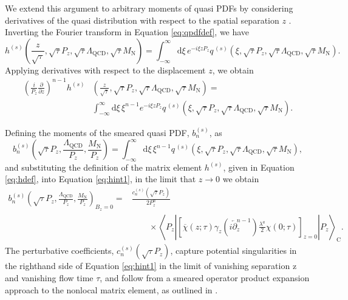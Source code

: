 We extend this argument to arbitrary 
moments of quasi PDFs by considering derivatives of the quasi distribution with 
respect to the spatial separation $z$ \cite{Collins:2011zzd}. Inverting the 
Fourier transform in Equation \eqref{eq:qpdfdef}, we have
\begin{equation}\label{eq:handqpdf}
h^{(s)}\left(\frac{z}{\sqrt{\tau}},\sqrt{\tau}P_z,\sqrt{\tau}\Lambda_{\mathrm{
QCD}},
\sqrt{\tau}
M_\mathrm{N}\right)
=
\int_{-\infty}^\infty \mathrm{d}\xi\, e^{-i\xi z 
P_z} 
q^{\,(s)}\left(\xi,\sqrt{\tau}P_z,\sqrt{\tau}\Lambda_{\mathrm{QCD}},\sqrt{\tau}
M_\mathrm{N}\right).
\end{equation}
Applying derivatives with respect to the displacement $z$, we obtain
\begin{align}\label{eq:hint1}
\left(\frac{i}{P_z}\frac{\partial}{\partial 
z}\right)^{n-1} 
h^{(s)}{} & 
\left(\frac{z}{\sqrt{\tau}},\sqrt{\tau}P_z,\sqrt{\tau}\Lambda_{\mathrm{QCD}},
\sqrt{
\tau }
M_\mathrm{N}\right) = \nonumber\\
{} & \int_{-\infty}^\infty \mathrm{d}\xi\, \xi^{n-1}e^{-i\xi z 
P_z} 
q^{\,(s)}\left(\xi,\sqrt{\tau}P_z,\sqrt{\tau}\Lambda_{\mathrm{QCD}},\sqrt{\tau}
M_\mathrm{N}\right).
\end{align}

Defining the moments of the smeared quasi PDF, $b_n^{(s)}$, as
\begin{equation}\label{eq:bdef}
b_n^{(s)}\left(\sqrt{\tau}P_z,\frac{\Lambda_{\mathrm{QCD}}}{P_z}, 
\frac{M_\mathrm{N}}{P_z}\right) 
= \int_{-\infty}^\infty 
\mathrm{d}\xi\, \xi^{n-1} 
q^{\,(s)}\left(\xi,\sqrt{\tau}P_z,\sqrt{\tau}\Lambda_{\mathrm{QCD}},\sqrt{\tau}
M_\mathrm{N}\right),
\end{equation}
and substituting the definition of the matrix element $h^{(s)}$, given in 
Equation \eqref{eq:hdef}, into Equation \eqref{eq:hint1}, in the limit that 
$z\rightarrow 0$ we obtain
\begin{align}
b_n^{(s)}\left( \sqrt{\tau}P_z,\frac{\Lambda_{\mathrm{QCD}}}{P_z}, 
\frac{M_\mathrm{N}}{P_z}\right)_{B_z=0}
= {} & \frac{c_n^{(s)}(\sqrt{\tau}P_z)}{2P_z^n} \nonumber\\
{} & \qquad \times \left\langle 
P_z \left| \left[\overline{\chi}(z;\tau) \gamma_z 
\left(i\overleftarrow{\partial}_z^{n-1}\right)\frac{\lambda^a}{2}
\chi(0;\tau)\right ] _{z=0 } \right|P_z\right\rangle_\mathrm{C}.
\end{align}
The perturbative coefficients, $c_n^{(s)}(\sqrt{\tau}P_z)$, capture potential 
singularities in the righthand side of Equation \eqref{eq:hint1} in the limit 
of vanishing separation z and vanishing flow time $\tau$, and follow from a smeared operator product expansion 
\cite{Monahan:2015lha} approach to the nonlocal matrix element, as outlined in 
\cite{Lin:2014zya}.

